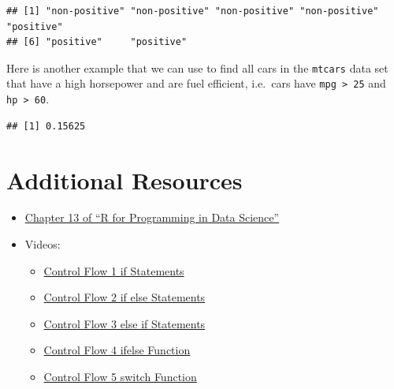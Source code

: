 \documentclass[
]{book}
\newenvironment{Shaded}{\begin{snugshade}}{\end{snugshade}}
\newcommand{\DecValTok}[1]{\textcolor[rgb]{0.00,0.00,0.81}{#1}}
\newcommand{\KeywordTok}[1]{\textcolor[rgb]{0.13,0.29,0.53}{\textbf{#1}}}
\newcommand{\NormalTok}[1]{#1}
\newcommand{\OperatorTok}[1]{\textcolor[rgb]{0.81,0.36,0.00}{\textbf{#1}}}
\newcommand{\OtherTok}[1]{\textcolor[rgb]{0.56,0.35,0.01}{#1}}
\newcommand{\StringTok}[1]{\textcolor[rgb]{0.31,0.60,0.02}{#1}}
\providecommand{\tightlist}{%
  \setlength{\itemsep}{0pt}\setlength{\parskip}{0pt}}
\begin{document}
\begin{verbatim}
## [1] "non-positive" "non-positive" "non-positive" "non-positive" "positive"    
## [6] "positive"     "positive"
\end{verbatim}

Here is another example that we can use to find all cars in the \texttt{mtcars} data set that have a high horsepower and are fuel efficient, i.e.~cars have \texttt{mpg\ \textgreater{}\ 25} and \texttt{hp\ \textgreater{}\ 60}.

\begin{Shaded}
\end{Shaded}

\begin{verbatim}
## [1] 0.15625
\end{verbatim}

\hypertarget{additional-resources-4}{%
\section*{Additional Resources}\label{additional-resources-4}}

\begin{itemize}
\tightlist
\item
  \href{https://bookdown.org/rdpeng/rprogdatascience/functions.html\#the-...-argument}{Chapter 13 of ``R for Programming in Data Science''}
\item
  Videos:

  \begin{itemize}
  \tightlist
  \item
    \href{https://ucr.yuja.com/V/Video?v=2369005\&node=8488277\&a=1089164180\&autoplay=1}{Control Flow 1 \textbar{} if Statements}
  \item
    \href{https://ucr.yuja.com/V/Video?v=2369004\&node=8488276\&a=68950775\&autoplay=1}{Control Flow 2 \textbar{} if else Statements}
  \item
    \href{https://ucr.yuja.com/V/Video?v=2369003\&node=8488275\&a=577245814\&autoplay=1}{Control Flow 3 \textbar{} else if Statements}
  \item
    \href{https://ucr.yuja.com/V/Video?v=2369002\&node=8488274\&a=2043700498\&autoplay=1}{Control Flow 4 \textbar{} ifelse Function}
  \item
    \href{https://ucr.yuja.com/V/Video?v=2369001\&node=8488273\&a=523725749\&autoplay=1}{Control Flow 5 \textbar{} switch Function}
  \end{itemize}
\end{itemize}
\end{document}
